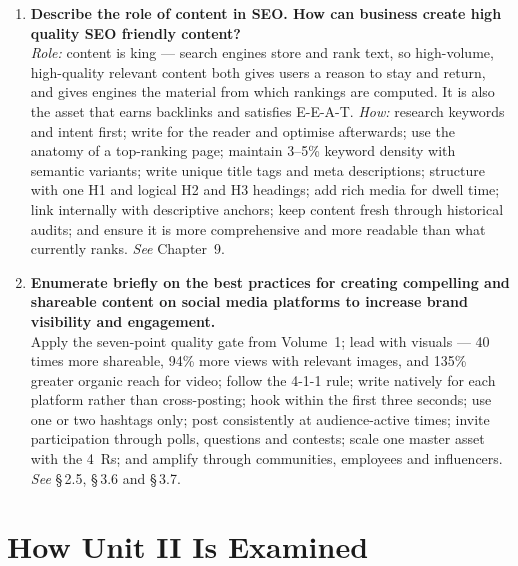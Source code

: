 \begin{enumerate}[leftmargin=2.2em,itemsep=1.4ex]
\item \textbf{Describe the role of content in SEO. How can business create high
      quality SEO friendly content?}
      \\
      \emph{Role:} content is king --- search engines store and rank text, so
      high-volume, high-quality relevant content both gives users a reason to
      stay and return, and gives engines the material from which rankings are
      computed. It is also the asset that earns backlinks and satisfies E-E-A-T.
      \emph{How:} research keywords and intent first; write for the reader and
      optimise afterwards; use the anatomy of a top-ranking page; maintain
      3--5\% keyword density with semantic variants; write unique title tags and
      meta descriptions; structure with one H1 and logical H2 and H3 headings;
      add rich media for dwell time; link internally with descriptive anchors;
      keep content fresh through historical audits; and ensure it is more
      comprehensive and more readable than what currently ranks.
      \hfill\emph{See} Chapter~9.

\item \textbf{Enumerate briefly on the best practices for creating compelling and
      shareable content on social media platforms to increase brand visibility
      and engagement.} \\
      Apply the seven-point quality gate from Volume~1; lead with visuals ---
      40 times more shareable, 94\% more views with relevant images, and 135\%
      greater organic reach for video; follow the 4-1-1 rule; write natively for
      each platform rather than cross-posting; hook within the first three
      seconds; use one or two hashtags only; post consistently at
      audience-active times; invite participation through polls, questions and
      contests; scale one master asset with the 4~Rs; and amplify through
      communities, employees and influencers.
      \hfill\emph{See} \S\,2.5, \S\,3.6 and \S\,3.7.

\end{enumerate}

\section*{How Unit II Is Examined}

